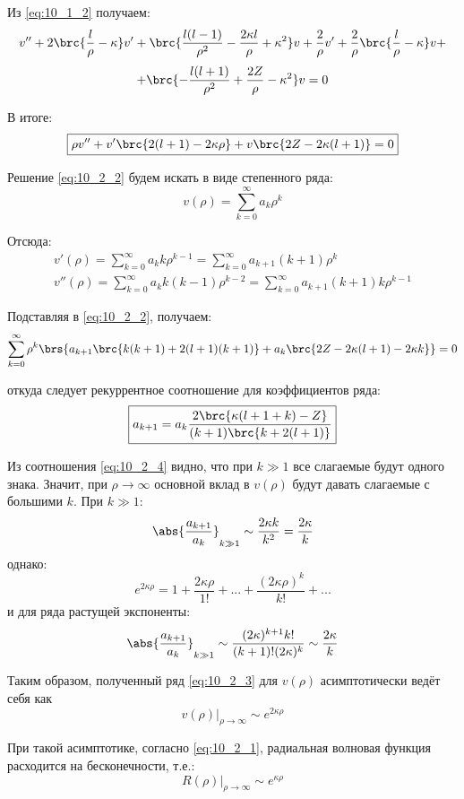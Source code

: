 Из \eqref{eq:10_1_2} получаем:
$$
v'' + 2\brc{\frac{l}{\rho} - \kappa}v' + \brc{ \frac{l(l-1)}{\rho^2} - \frac{2\kappa l}{\rho} + \kappa^2 } v + \frac{2}{\rho}v' + \frac{2}{\rho} \brc{ \frac{l}{\rho} - \kappa} v + 
$$
$$
+\brc{- \frac{l(l+1)}{\rho^2} + \frac{2Z}{\rho} - \kappa^2}v = 0
$$

В итоге:
\begin{equation}
\label{eq:10_2_2}
\boxed{
	\rho v'' + v' \brc{2(l+1) - 2\kappa \rho} + v\brc{2Z - 2\kappa(l+1)} = 0
}
\end{equation}

Решение \eqref{eq:10_2_2} будем искать в виде степенного ряда:
\begin{equation}
\label{eq:10_2_3}
v(\rho) = \sum_{k=0}^{\infty} a_k \rho^k
\end{equation}

Отсюда:
$$
\begin{gathered}
v'(\rho) = \sum_{k=0}^{\infty} a_k k \rho^{k-1} = \sum_{k=0}^{\infty} a_{k+1} (k+1) \rho^k \\
v''(\rho) = \sum_{k=0}^{\infty} a_k k (k-1) \rho^{k-2} = \sum_{k=0}^{\infty} a_{k+1} (k+1) k \rho^{k-1}
\end{gathered}
$$

Подставляя в \eqref{eq:10_2_2}, получаем:
$$
\sum_{k=0}^{\infty} \rho^k \brs{a_{k+1} \brc{k(k+1) + 2(l+1)(k+1)} + a_k\brc{2Z - 2\kappa(l+1) - 2\kappa k} } = 0
$$

откуда следует рекуррентное соотношение для коэффициентов ряда:
\begin{equation}
\label{eq:10_2_4}
\boxed{
	a_{k+1} = a_k \frac{2\brc{\kappa(l+1+k)-Z}}{(k+1)\brc{k+2(l+1)}}
}
\end{equation}

Из соотношения \eqref{eq:10_2_4} видно, что при $k \gg 1$ все слагаемые будут одного знака. Значит, при $\rho \to \infty$ основной вклад в $v(\rho)$ будут давать слагаемые с большими $k$. При $k \gg 1$:
$$
{ \abs{\frac{a_{k+1}}{a_k}} }_{k \gg 1} \sim \frac{2\kappa k}{k^2} = \frac{2\kappa}{k}
$$
однако:
$$
e^{2\kappa \rho} = 1 + \frac{2\kappa \rho}{1!} + ... + \frac{(2\kappa \rho)^k}{k!} + ...
$$
и для ряда растущей экспоненты:
$$
{ \abs{\frac{a_{k+1}}{a_k}} }_{k \gg 1} \sim \frac{(2\kappa)^{k+1} k!}{(k+1)! (2\kappa)^k} \sim \frac{2\kappa}{k}
$$

Таким образом, полученный ряд \eqref{eq:10_2_3} для $v(\rho)$ асимптотически ведёт себя как
$$
\left. v(\rho) \right|_{\rho \to \infty} \sim e^{2\kappa \rho}
$$

При такой асимптотике, согласно \eqref{eq:10_2_1}, радиальная волновая функция расходится на бесконечности, т.е.:
$$
\left. R(\rho) \right|_{\rho \to \infty} \sim e^{\kappa \rho}
$$

